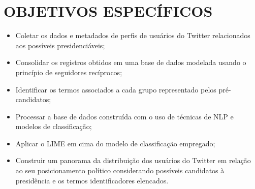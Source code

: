 \section{OBJETIVOS ESPECÍFICOS}
\label{sec:objetivos_especificos}

\begin{itemize}
    \item Coletar os dados e metadados de perfis de usuários do Twitter relacionados aos possíveis presidenciáveis;
    \item Consolidar os registros obtidos em uma base de dados modelada usando o princípio de seguidores recíprocos;
    \item Identificar os termos associados a cada grupo representado pelos pré-candidatos;
    \item Processar a base de dados construída com o uso de técnicas de NLP e modelos de classificação;
    \item Aplicar o LIME em cima do modelo de classificação empregado;
    \item Construir um panorama da distribuição dos usuários do Twitter em relação ao seu posicionamento político considerando possíveis candidatos à presidência e os termos identificadores elencados.
\end{itemize}
